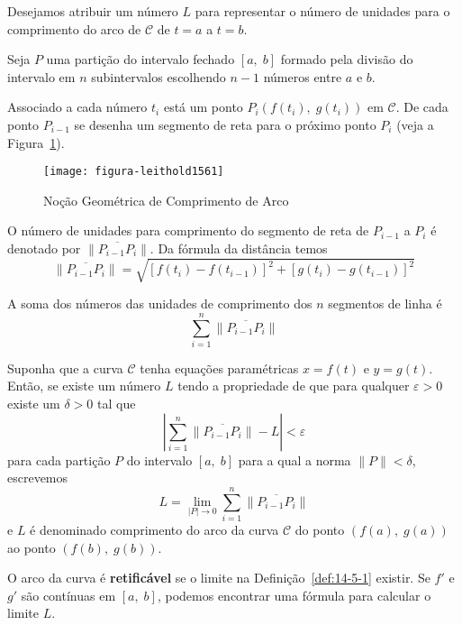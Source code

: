 Desejamos atribuir um número \(L\) para representar o número de unidades para o comprimento do arco de \( \mathcal{C}\) de \(t = a\) a \(t = b\).

Seja \(P\)  uma partição do intervalo fechado \([a,\; b]\) formado pela divisão do intervalo em \(n\) subintervalos escolhendo \(n-1\) números entre \(a\) e \(b\).

Associado a cada número \(t_{i}\) está um ponto \(P_{i}(f(t_{i}),\; g(t_{i}))\) em \( \mathcal{C}\). De cada ponto \(P_{i-1}\) se desenha um segmento
de reta para o próximo ponto \(P_{i}\) (veja a Figura~\ref{fig:1561}).
\begin{figure}[!h]
  \centering
  \texttt{[image: figura-leithold1561]}
  \caption{Noção Geométrica de Comprimento de Arco}\label{fig:1561}
\end{figure}

O número de unidades para comprimento do segmento de reta de \(P_{i-1}\) a \(P_{i}\) é denotado por \(\|\overline{P_{i-1}P_{i}}\|\). Da fórmula da distância temos
\begin{equation*}
\|\overline{P_{i-1}P_{i}}\|=\sqrt{[f(t_{i})-f(t_{i-1})]^{2}+[g(t_{i})-g(t_{i-1})]^{2}}
\end{equation*}

A soma dos números das unidades de comprimento dos $n$ segmentos de linha é
\begin{equation*}
  \sum_{i=1}^{n}\|\overline{P_{i-1}P_{i}}\|
\end{equation*}


\begin{defi}\label{def:14-5-1}
	Suponha que a curva \( \mathcal{C}\) tenha equações paramétricas \(x = f (t)\) e \(y = g (t)\). Então, se existe um número \(L\) tendo a propriedade de que para qualquer \(\varepsilon > 0\) existe um \( \delta> 0\) tal que
	\begin{equation*}
		\left|\sum_{i=1}^{n}\|\overline{P_{i-1}P_{i}}\|- L \right| < \varepsilon
	\end{equation*}
	para cada partição \(P\) do intervalo \([a,\; b]\) para a qual a norma \(\|{P}\| <\delta\), escrevemos
	\begin{equation*}
		L=\lim_{|{P}| \to 0}\sum_{i=1}^{n}\|\overline{P_{i-1}P_{i}}\|
	\end{equation*}
	e \(L\) é denominado comprimento do arco da curva \(\mathcal{C}\) do ponto \((f(a),\; g (a))\) ao ponto
	\((f(b),\; g (b))\).
\end{defi}

O arco da curva é \textbf{retificável} se o limite na Definição~\ref{def:14-5-1} existir. Se \(f'\) e \(g'\) são contínuas em \([a,\; b]\), podemos
encontrar uma fórmula para calcular o limite \(L\).

